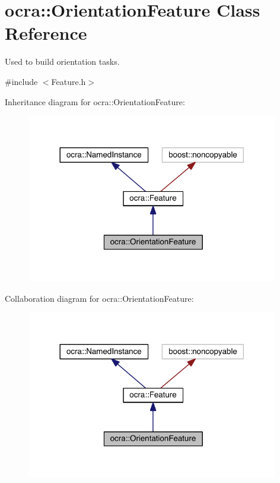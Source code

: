 \hypertarget{classocra_1_1OrientationFeature}{}\section{ocra\+:\+:Orientation\+Feature Class Reference}
\label{classocra_1_1OrientationFeature}


Used to build orientation tasks.  




{\ttfamily \#include $<$Feature.\+h$>$}



Inheritance diagram for ocra\+:\+:Orientation\+Feature\+:\nopagebreak
\begin{figure}[H]
\begin{center}
\leavevmode
\includegraphics[width=312pt]{d8/d0b/classocra_1_1OrientationFeature__inherit__graph}
\end{center}
\end{figure}


Collaboration diagram for ocra\+:\+:Orientation\+Feature\+:\nopagebreak
\begin{figure}[H]
\begin{center}
\leavevmode
\includegraphics[width=312pt]{d4/df2/classocra_1_1OrientationFeature__coll__graph}
\end{center}
\end{figure}
